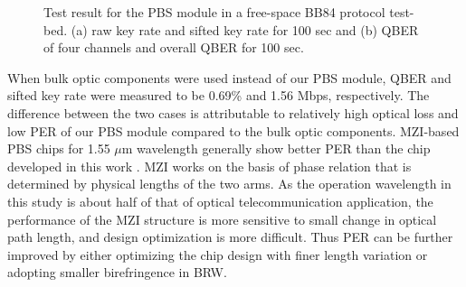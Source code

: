 \documentclass[letterpaper, 10pt]{article}
\begin{document}
\begin{figure}[ht]
  \centering
  \caption{Test result for the PBS module in a free-space BB84 protocol test-bed. (a) raw key rate and sifted key rate for 100 sec and (b) QBER of four channels and overall QBER for 100 sec.}
  \label{fig:QKD_result}
\end{figure}
When bulk optic components were used instead of our PBS module, QBER and sifted key rate were measured to be 0.69\% and 1.56 Mbps, respectively.
The difference between the two cases is attributable to relatively high optical loss and low PER of our PBS module compared to the bulk optic components.
MZI-based PBS chips for 1.55 $\mu$m wavelength generally show better PER than the chip developed in this work \cite{Hashizume:2015ta}.
MZI works on the basis of phase relation that is determined by physical lengths of the two arms.
As the operation wavelength in this study is about half of that of optical telecommunication application, the performance of the MZI structure is more sensitive to small change in optical path length, and design optimization is more difficult.
Thus PER can be further improved by either optimizing the chip design with finer length variation or adopting smaller birefringence in BRW.
\end{document}

